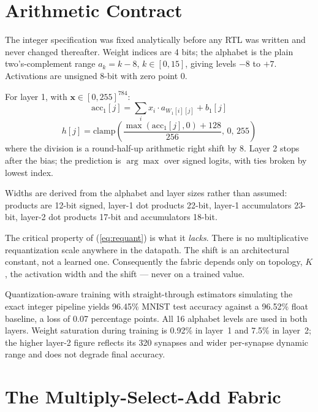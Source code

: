\documentclass[conference]{IEEEtran}
\begin{document}
\section{Arithmetic Contract}

The integer specification was fixed analytically before any RTL was written and
never changed thereafter. Weight indices are 4 bits; the alphabet is the plain
two's-complement range $a_k = k - 8$, $k \in [0,15]$, giving levels $-8$ to
$+7$. Activations are unsigned 8-bit with zero point 0.

For layer 1, with $\mathbf{x} \in [0,255]^{784}$:
\begin{equation}
\mathrm{acc}_1[j] = \sum_{i} x_i \cdot a_{W_1[i][j]} + b_1[j]
\end{equation}
\begin{equation}
h[j] = \mathrm{clamp}\!\left(\frac{\max(\mathrm{acc}_1[j],0) + 128}{256},\, 0,\, 255\right)
\label{eq:requant}
\end{equation}
where the division is a round-half-up arithmetic right shift by 8. Layer 2
stops after the bias; the prediction is $\arg\max$ over signed logits, with
ties broken by lowest index.

Widths are derived from the alphabet and layer sizes rather than assumed:
products are 12-bit signed, layer-1 dot products 22-bit, layer-1 accumulators
23-bit, layer-2 dot products 17-bit and accumulators 18-bit.

The critical property of (\ref{eq:requant}) is what it \emph{lacks}. There is no
multiplicative requantization scale anywhere in the datapath. The shift is an
architectural constant, not a learned one. Consequently the fabric depends only
on topology, $K$, the activation width and the shift --- never on a trained
value.

Quantization-aware training with straight-through estimators simulating the
exact integer pipeline yields 96.45\% MNIST test accuracy against a 96.52\%
float baseline, a loss of 0.07 percentage points. All 16 alphabet levels are
used in both layers. Weight saturation during training is 0.92\% in layer~1 and
7.5\% in layer~2; the higher layer-2 figure reflects its 320 synapses and wider
per-synapse dynamic range and does not degrade final accuracy.

\section{The Multiply-Select-Add Fabric}
\end{document}
